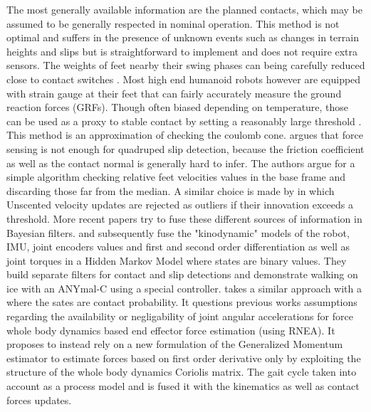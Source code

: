 The most generally available information are the planned contacts, which may be assumed to be generally respected in nominal operation. 
This method is not optimal and suffers in the presence of unknown events such as changes in terrain heights and slips but is straightforward to implement and 
does not require extra sensors. The weights of feet nearby their swing phases can being carefully reduced close to contact switches \cite{leziart2021, bledt2018contact}. 
Most high end humanoid robots however \cite{stasse2017talos, englsberger2014overview} are equipped with strain gauge at their feet that can fairly accurately measure the ground reaction forces (GRFs). 
Though often biased depending on temperature, those can be used as a proxy to stable contact by setting a reasonably large threshold \cite{fallon2014drift}. 
This method is an approximation of checking the coulomb cone.
\cite{Focchi2015SlipDA} argues that force sensing is not enough for quadruped slip detection, because the friction coefficient
as well as the contact normal is generally hard to infer. The authors argue for a simple algorithm checking relative feet velocities values in the base frame and discarding those
far from the median. A similar choice is made by \cite{bloesch2013stateSlippery} in which Unscented \KalmanF velocity updates are rejected as outliers if their innovation exceeds a threshold.  
More recent papers try to fuse these different sources of information in Bayesian filters. \cite{hwangbo2016probabilistic} and subsequently \cite{jenelten2019dynamic} fuse 
the  "kinodynamic" models of the robot, IMU, joint encoders values and first and second order differentiation as well as
joint torques in a Hidden Markov Model where states are binary values. They build separate filters for contact and slip detections and demonstrate walking on ice with an ANYmal-C using a special controller.
\cite{bledt2018contact} takes a similar approach with a \KalmanF where the sates are contact probability. It questions previous works assumptions regarding the availability 
\cite{hwangbo2016probabilistic} or negligability \cite{camurri2017probabilistic} of joint angular accelerations for force whole body dynamics based end effector force estimation (using RNEA).
It proposes to instead rely on a new formulation of the Generalized Momentum estimator to estimate forces based on first order derivative only by exploiting the 
structure of the whole body dynamics Coriolis matrix. The gait cycle taken into account as a process model and is fused it with the kinematics as well as contact forces updates.  

